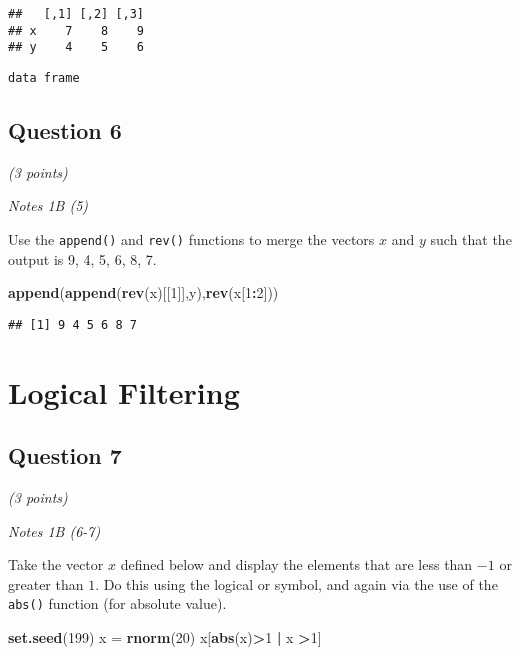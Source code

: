 \documentclass[
]{article}
\newenvironment{Shaded}{\begin{snugshade}}{\end{snugshade}}
\newcommand{\DecValTok}[1]{\textcolor[rgb]{0.00,0.00,0.81}{#1}}
\newcommand{\KeywordTok}[1]{\textcolor[rgb]{0.13,0.29,0.53}{\textbf{#1}}}
\newcommand{\NormalTok}[1]{#1}
\newcommand{\OperatorTok}[1]{\textcolor[rgb]{0.81,0.36,0.00}{\textbf{#1}}}
\newcommand{\StringTok}[1]{\textcolor[rgb]{0.31,0.60,0.02}{#1}}
\begin{document}
\begin{verbatim}
##   [,1] [,2] [,3]
## x    7    8    9
## y    4    5    6
\end{verbatim}

\begin{verbatim}
data frame
\end{verbatim}

\hypertarget{question-6}{%
\subsection{Question 6}\label{question-6}}

\emph{(3 points)}

\emph{Notes 1B (5)}

Use the \texttt{append()} and \texttt{rev()} functions to merge the
vectors \(x\) and \(y\) such that the output is 9, 4, 5, 6, 8, 7.

\begin{Shaded}
\begin{Highlighting}[]
\KeywordTok{append}\NormalTok{(}\KeywordTok{append}\NormalTok{(}\KeywordTok{rev}\NormalTok{(x)[[}\DecValTok{1}\NormalTok{]],y),}\KeywordTok{rev}\NormalTok{(x[}\DecValTok{1}\OperatorTok{:}\DecValTok{2}\NormalTok{]))}
\end{Highlighting}
\end{Shaded}

\begin{verbatim}
## [1] 9 4 5 6 8 7
\end{verbatim}

\hypertarget{logical-filtering}{%
\section{Logical Filtering}\label{logical-filtering}}

\hypertarget{question-7}{%
\subsection{Question 7}\label{question-7}}

\emph{(3 points)}

\emph{Notes 1B (6-7)}

Take the vector \(x\) defined below and display the elements that are
less than \(-1\) or greater than \(1\). Do this using the logical or
symbol, and again via the use of the \texttt{abs()} function (for
absolute value).

\begin{Shaded}
\begin{Highlighting}[]
\KeywordTok{set.seed}\NormalTok{(}\DecValTok{199}\NormalTok{)}
\NormalTok{x =}\StringTok{ }\KeywordTok{rnorm}\NormalTok{(}\DecValTok{20}\NormalTok{)}
\NormalTok{x[}\KeywordTok{abs}\NormalTok{(x)}\OperatorTok{>}\DecValTok{1} \OperatorTok{|}\StringTok{ }\NormalTok{x }\OperatorTok{>}\DecValTok{1}\NormalTok{]}
\end{Highlighting}
\end{Shaded}
\end{document}
